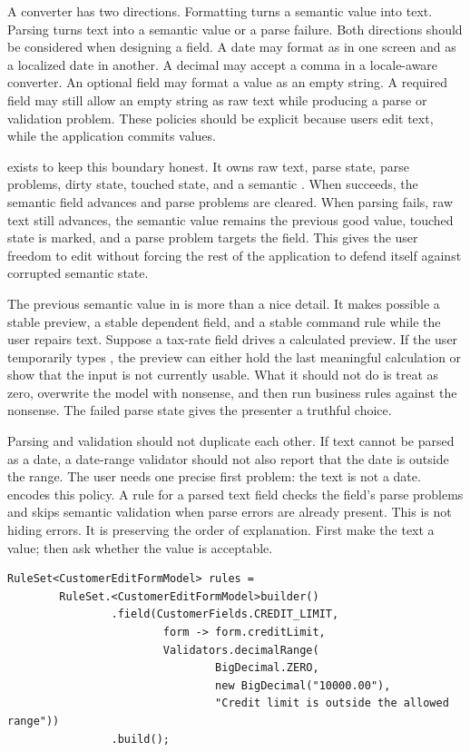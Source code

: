 A converter has two directions. Formatting turns a semantic value into text.
Parsing turns text into a semantic value or a parse failure. Both directions
should be considered when designing a field. A date may format as
 in one screen and as a localized date in another. A decimal
may accept a comma in a locale-aware converter. An optional field may format a
 value as an empty string. A required field may still allow an empty
string as raw text while producing a parse or validation problem. These
policies should be explicit because users edit text, while the application
commits values.

 exists to keep this boundary honest. It owns raw text,
parse state, parse problems, dirty state, touched state, and a semantic
. When  succeeds, the semantic field advances
and parse problems are cleared. When parsing fails, raw text still advances,
the semantic value remains the previous good value, touched state is marked,
and a parse problem targets the field. This gives the user freedom to edit
without forcing the rest of the application to defend itself against corrupted
semantic state.

The previous semantic value in  is more than a nice
detail. It makes possible a stable preview, a stable dependent field, and a
stable command rule while the user repairs text. Suppose a tax-rate field
drives a calculated preview. If the user temporarily types , the
preview can either hold the last meaningful calculation or show that the input
is not currently usable. What it should not do is treat  as zero,
overwrite the model with nonsense, and then run business rules against the
nonsense. The failed parse state gives the presenter a truthful choice.

Parsing and validation should not duplicate each other. If text cannot be
parsed as a date, a date-range validator should not also report that the date
is outside the range. The user needs one precise first problem: the text is not
a date.  encodes this policy. A rule for a parsed
text field checks the field's parse problems and skips semantic validation when
parse errors are already present. This is not hiding errors. It is preserving
the order of explanation. First make the text a value; then ask whether the
value is acceptable.

\begin{lstlisting}[caption={RuleSet skips semantic validation after parse failure.}]
RuleSet<CustomerEditFormModel> rules =
        RuleSet.<CustomerEditFormModel>builder()
                .field(CustomerFields.CREDIT_LIMIT,
                        form -> form.creditLimit,
                        Validators.decimalRange(
                                BigDecimal.ZERO,
                                new BigDecimal("10000.00"),
                                "Credit limit is outside the allowed range"))
                .build();
\end{lstlisting}

